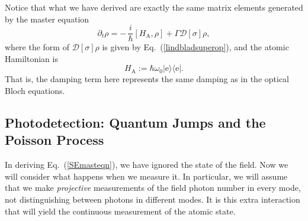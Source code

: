 \documentclass[aps,twocolumn,superscriptaddress,footinbib,floatfix,showpacs]{revtex4}
\def\ket#1{|{#1}\rangle}
\def\bra#1{\langle{#1}|}
\def\HA{H_\mathrm{\scriptscriptstyle A}}
\begin{document}
Notice that what we have derived are exactly the same matrix elements generated
by the master equation
\begin{equation}
  \partial_t\rho = -\,\frac{i}{\hbar}[\HA,\rho] +\Gamma\mathcal{D}[\sigma]\rho,
  \label{SEmasteqn}
\end{equation}
where the form of $\mathcal{D}[\sigma]\rho$ is given by Eq.~(\ref{lindbladsuperop}),
and the atomic Hamiltonian is
\begin{equation}
  \HA := \hbar\omega_0 \ket{\mathrm{e}}\bra{\mathrm{e}}.
\end{equation}
That is, the damping term here represents the same damping
as in the optical Bloch equations.


\subsection{Photodetection: Quantum Jumps and the Poisson Process}\label{section:photodetection}

In deriving Eq.~(\ref{SEmasteqn}), we have ignored the
state of the field.  Now we will consider what happens when we measure
it.  In particular, we will assume that we make \textit{projective}
measurements of the field photon number in every mode, not distinguishing
between photons in different modes.
It is this extra interaction that will yield the continuous measurement
of the atomic state.
\end{document}
